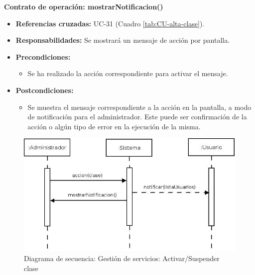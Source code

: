 \textbf{Contrato de operación: mostrarNotificacion()}
\begin{itemize}
\item \textbf{Referencias cruzadas:} UC-31 (Cuadro \ref{tab:CU-alta-clase}).
\item \textbf{Responsabilidades:} Se mostrará un mensaje de acción por pantalla.
\item \textbf{Precondiciones:} 
 \begin{itemize}
\item Se ha realizado la acción correspondiente para activar el mensaje.
\end {itemize}
\item \textbf{Postcondiciones:} 
 \begin{itemize}
\item Se muestra el mensaje correspondiente a la acción en la pantalla, a modo de notificación para el administrador. Este puede ser confirmación de la acción o algún tipo de error en la ejecución de la misma.
\end {itemize}
\end {itemize}


\vspace{10mm}

\begin{figure}[H]
\centering
  \includegraphics[scale=.55]{img/secuencias/gestion-servicios-suspender-activar-clase.jpeg}
  \caption{Diagrama de secuencia: Gestión de servicios: Activar/Suspender clase}
  \label{fig:secuencia-gestion-servicios-suspender-activar-clase}
\end{figure}


